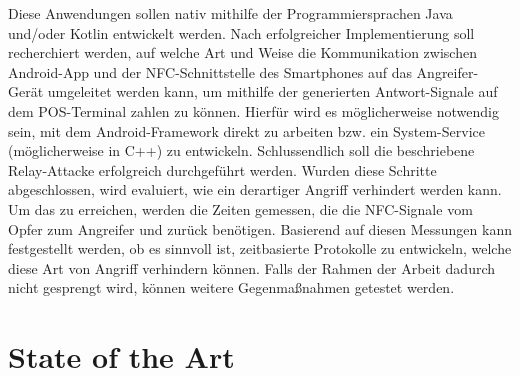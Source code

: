 \documentclass[a4paper,10pt,ngerman]{INSOexpose}
\begin{document}
{	\newline Diese Anwendungen sollen nativ mithilfe der Programmiersprachen Java und/oder Kotlin entwickelt werden. Nach erfolgreicher Implementierung soll recherchiert werden, auf welche Art und Weise die Kommunikation zwischen Android-App und der NFC-Schnittstelle des Smartphones auf das Angreifer-Gerät umgeleitet werden kann, um mithilfe der generierten Antwort-Signale auf dem POS-Terminal zahlen zu können. Hierfür wird es möglicherweise notwendig sein, mit dem Android-Framework direkt zu arbeiten bzw. ein System-Service (möglicherweise in C++) zu entwickeln. Schlussendlich soll die beschriebene Relay-Attacke erfolgreich durchgeführt werden. 
	Wurden diese Schritte abgeschlossen, wird evaluiert, wie ein derartiger Angriff verhindert werden kann. Um das zu erreichen, werden die Zeiten gemessen, die die NFC-Signale vom Opfer zum Angreifer und zurück benötigen. Basierend auf diesen Messungen kann festgestellt werden, ob es sinnvoll ist, zeitbasierte Protokolle zu entwickeln, welche diese Art von Angriff verhindern können. Falls der Rahmen der Arbeit dadurch nicht gesprengt wird, können weitere Gegenmaßnahmen getestet werden. 
}

\section{State of the Art}
\end{document}
